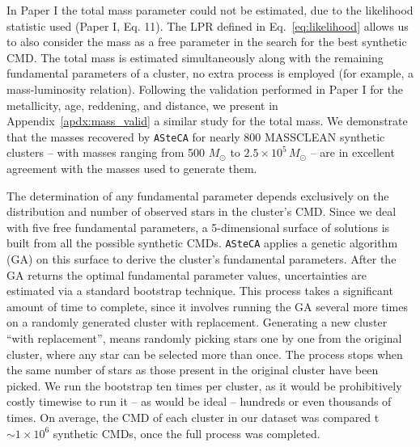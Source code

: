 \documentclass{aa}
\begin{document}
%
In Paper I the total mass parameter could not be estimated, due to the
likelihood statistic used (Paper I, Eq. 11). The LPR defined in
Eq.~\ref{eq:likelihood} allows us to also consider the mass as a free parameter
in the search for the best synthetic CMD.\@
%
The total mass is estimated simultaneously along with the remaining
fundamental parameters of a cluster, no extra process is employed (for example,
a mass-luminosity relation).
%
Following the validation performed in Paper I for the metallicity, age,
reddening, and distance, we present in Appendix~\ref{apdx:mass_valid} a
similar study for the total mass. We demonstrate that the masses recovered by
\texttt{ASteCA} for nearly 800 MASSCLEAN synthetic clusters -- with
masses ranging from 500 $M_{\odot}$ to $2.5\times10^5\,M_{\odot}$ -- are in
excellent agreement with the masses used to generate them.

The determination of any fundamental parameter depends exclusively on
the distribution and number of observed stars in the cluster's CMD.\@
Since we deal with five free fundamental parameters, a 5-dimensional surface of
solutions is built from all the possible synthetic CMDs.
\texttt{ASteCA} applies a genetic algorithm (GA) on this surface to derive the
cluster's fundamental parameters.
%
%
After the GA returns the optimal fundamental parameter values, uncertainties are
estimated via a standard bootstrap technique. This process takes a significant
amount of time to complete, since it involves running the GA several more times
on a randomly generated cluster with replacement. Generating a new
cluster ``with replacement'', means randomly picking stars one by one from the
original cluster, where any star can be selected more than once. The process
stops when the same number of stars as those present in the original cluster
have been picked.
We run the bootstrap ten times per cluster, as it would be prohibitively
costly timewise to run it -- as would be ideal -- hundreds or even thousands of
times.
On average, the CMD of each cluster in our dataset was compared t
${\sim}1{\times}10^6$ synthetic CMDs, once the full process was completed.
\end{document}
